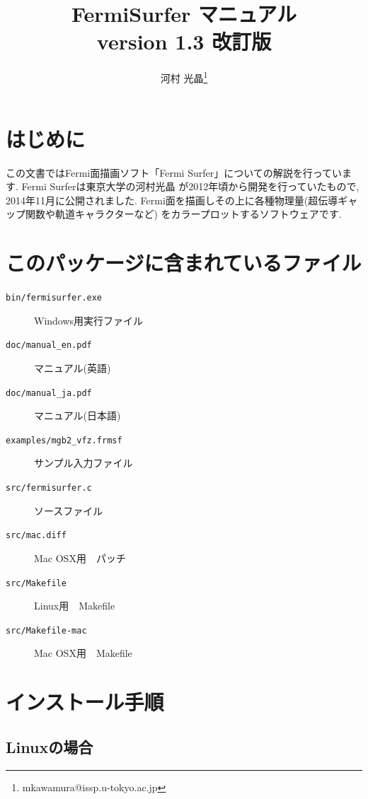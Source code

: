 \documentclass[12pt]{jarticle}
\begin{document}
%
%
\title{FermiSurfer マニュアル \\
version 1.3 改訂版}
\author{河村 光晶\footnote{mkawamura@issp.u-tokyo.ac.jp}}
\maketitle

\tableofcontents

\section{はじめに}

この文書ではFermi面描画ソフト「Fermi Surfer」についての解説を行っています. 
Fermi Surferは東京大学の河村光晶
が2012年頃から開発を行っていたもので, 
2014年11月に公開されました. 
Fermi面を描画しその上に各種物理量(超伝導ギャップ関数や軌道キャラクターなど)
をカラープロットするソフトウェアです. 

\section{このパッケージに含まれているファイル}
\begin{description}
\item[\texttt{bin/fermisurfer.exe}] Windows用実行ファイル
\item[\texttt{doc/manual\_en.pdf}] マニュアル(英語)
\item[\texttt{doc/manual\_ja.pdf}] マニュアル(日本語)
\item[\texttt{examples/mgb2\_vfz.frmsf}] サンプル入力ファイル
\item[\texttt{src/fermisurfer.c}] ソースファイル
\item[\texttt{src/mac.diff}] Mac OSX用　パッチ
\item[\texttt{src/Makefile}] Linux用　Makefile
\item[\texttt{src/Makefile-mac}] Mac OSX用　Makefile
\end{description}

\section{インストール手順}

\subsection{Linuxの場合}
\end{document}
